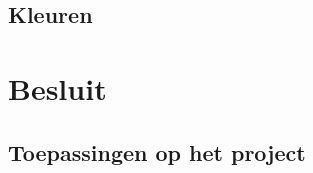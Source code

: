 \documentclass[a4paper,11pt]{article}
\begin{document}
	\subsection{Kleuren}\label{subsec:kleuren}
		

\section{Besluit}\label{sec:besluit}
	
	
	\subsection{Toepassingen op het project}\label{subsec:toepassingen}
		

\newpage
{}


\end{document}

